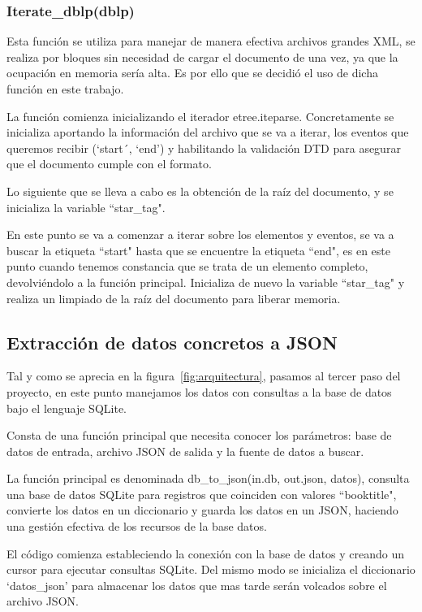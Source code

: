 \documentclass[a4paper, 12pt]{book}
\begin{document}
\subsubsection{Iterate\_dblp(dblp)}

Esta función se utiliza para manejar de manera efectiva archivos grandes XML, se realiza por bloques sin necesidad de cargar el documento de una vez, ya que la ocupación en memoria sería alta. Es por ello que se decidió el uso de dicha función en este trabajo.

La función comienza inicializando el iterador etree.iteparse. Concretamente se inicializa aportando la información del archivo que se va a iterar, los eventos que queremos recibir (`start´, `end') y habilitando la validación DTD para asegurar que el documento cumple con el formato.

Lo siguiente que se lleva a cabo es la obtención de la raíz del documento, y se inicializa la variable ``star\_tag".

En este punto se va a comenzar a iterar sobre los elementos y eventos, se va a buscar la etiqueta ``start" hasta que se encuentre la etiqueta ``end", es en este punto cuando tenemos constancia que se trata de un elemento completo, devolviéndolo a la función principal. Inicializa de nuevo la variable ``star\_tag" y realiza un limpiado de la raíz del documento para liberar memoria.


\subsection{Extracción de datos concretos a JSON}
Tal y como se aprecia en la figura~\ref{fig:arquitectura}, pasamos al tercer paso del proyecto, en este punto manejamos los datos con consultas a la base de datos bajo el lenguaje SQLite. 

Consta de una función principal que necesita conocer los parámetros: base de datos de entrada, archivo JSON de salida y la fuente de datos a buscar.

La función principal es denominada db\_to\_json(in.db, out.json, datos), consulta una base de datos SQLite para registros que coinciden con valores ``booktitle", convierte los datos en un diccionario y guarda los datos en un JSON, haciendo una gestión efectiva de los recursos de la base datos.

El código comienza estableciendo la conexión con la base de datos y creando un cursor para ejecutar consultas SQLite. Del mismo modo se inicializa el diccionario `datos\_json' para almacenar los datos que mas tarde serán volcados sobre el archivo JSON.
\end{document}
